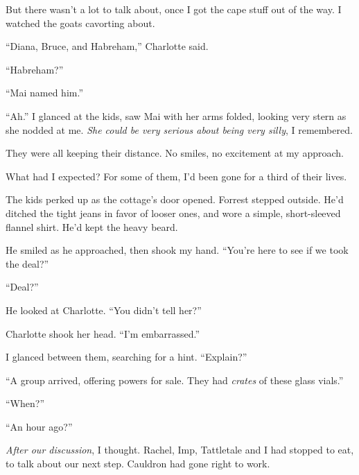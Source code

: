 But there wasn't a lot to talk about, once I got the cape stuff out of the way.  I watched the goats cavorting about.



``Diana, Bruce, and Habreham,''  Charlotte said.



``Habreham?''



``Mai named him.''



``Ah.''  I glanced at the kids, saw Mai with her arms folded, looking very stern as she nodded at me.  \emph{She could be very serious about being very silly}, I remembered.



They were all keeping their distance.  No smiles, no excitement at my approach.



What had I expected?  For some of them, I'd been gone for a third of their lives.



The kids perked up as the cottage's door opened.  Forrest stepped outside.  He'd ditched the tight jeans in favor of looser ones, and wore a simple, short-sleeved flannel shirt.  He'd kept the heavy beard.



He smiled as he approached, then shook my hand.  ``You're here to see if we took the deal?''



``Deal?''



He looked at Charlotte.  ``You didn't tell her?''



Charlotte shook her head.  ``I'm embarrassed.''



I glanced between them, searching for a hint.  ``Explain?''



``A group arrived, offering powers for sale.  They had \emph{crates} of these glass vials.''



``When?''



``An hour ago?''



\emph{After our discussion}, I thought.  Rachel, Imp, Tattletale and I had stopped to eat, to talk about our next step.  Cauldron had gone right to work.



